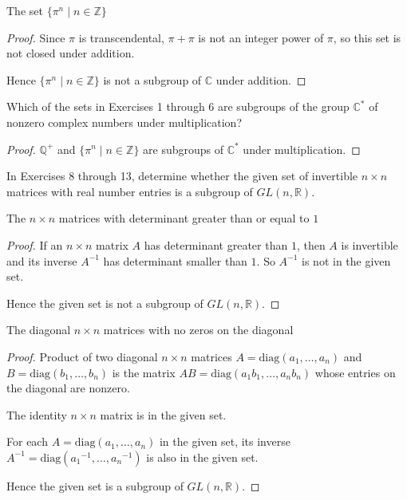 \newpage
\begin{exercise}
    The set $\{ \pi^{n} \mid n\in\mathbb{Z} \}$
\end{exercise}

\begin{proof}
    Since $\pi$ is transcendental, $\pi + \pi$ is not an integer power of $\pi$, so this set is not closed under addition.

    Hence $\{ \pi^{n} \mid n\in\mathbb{Z} \}$ is not a subgroup of $\mathbb{C}$ under addition.
\end{proof}

\newpage
\begin{exercise}
    Which of the sets in Exercises 1 through 6 are subgroups of the group $\mathbb{C}^{*}$ of nonzero complex numbers under multiplication?
\end{exercise}

\begin{proof}
    $\mathbb{Q}^{+}$ and $\{ \pi^{n} \mid n\in\mathbb{Z} \}$ are subgroups of $\mathbb{C}^{*}$ under multiplication.
\end{proof}

In Exercises 8 through 13, determine whether the given set of invertible $n\times n$ matrices with real number entries is a subgroup of $GL(n, \mathbb{R})$.

\newpage
\begin{exercise}
    The $n\times n$ matrices with determinant greater than or equal to $1$
\end{exercise}

\begin{proof}
    If an $n\times n$ matrix $A$ has determinant greater than $1$, then $A$ is invertible and its inverse $A^{-1}$ has determinant smaller than $1$. So $A^{-1}$ is not in the given set.

    Hence the given set is not a subgroup of $GL(n, \mathbb{R})$.
\end{proof}

\newpage
\begin{exercise}
    The diagonal $n\times n$ matrices with no zeros on the diagonal
\end{exercise}

\begin{proof}
    Product of two diagonal $n\times n$ matrices $A = \text{diag}(a_{1}, \ldots, a_{n})$ and $B = \text{diag}(b_{1}, \ldots, b_{n})$ is the matrix $AB = \text{diag}(a_{1}b_{1}, \ldots, a_{n}b_{n})$ whose entries on the diagonal are nonzero.

    The identity $n\times n$ matrix is in the given set.

    For each $A = \text{diag}(a_{1}, \ldots, a_{n})$ in the given set, its inverse $A^{-1} = \text{diag}({a_{1}}^{-1}, \ldots, {a_{n}}^{-1})$ is also in the given set.

    Hence the given set is a subgroup of $GL(n, \mathbb{R})$.
\end{proof}

